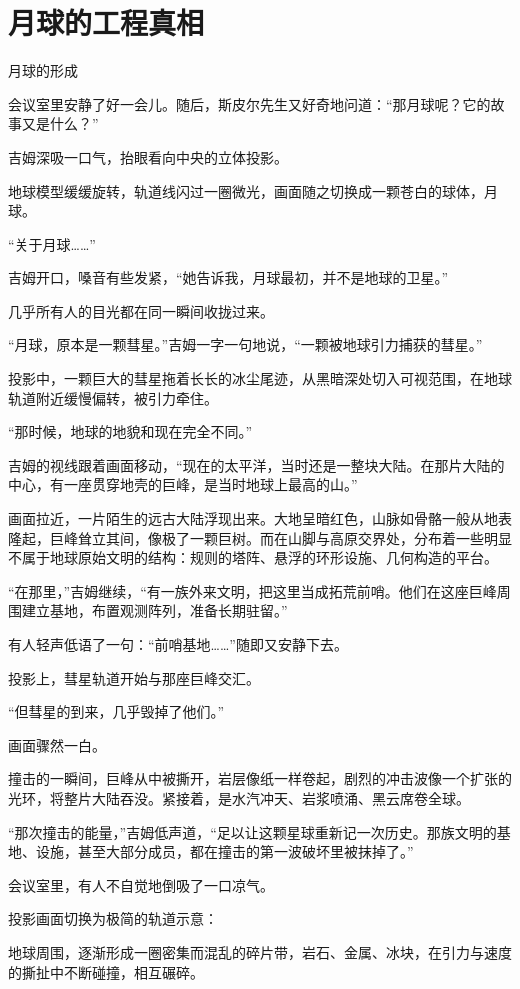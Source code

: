 \chapter{月球的工程真相}

月球的形成

会议室里安静了好一会儿。随后，斯皮尔先生又好奇地问道：“那月球呢？它的故事又是什么？”

吉姆深吸一口气，抬眼看向中央的立体投影。

地球模型缓缓旋转，轨道线闪过一圈微光，画面随之切换成一颗苍白的球体，月球。

“关于月球……”

吉姆开口，嗓音有些发紧，“她告诉我，月球最初，并不是地球的卫星。”

几乎所有人的目光都在同一瞬间收拢过来。

“月球，原本是一颗彗星。”吉姆一字一句地说，“一颗被地球引力捕获的彗星。”

投影中，一颗巨大的彗星拖着长长的冰尘尾迹，从黑暗深处切入可视范围，在地球轨道附近缓慢偏转，被引力牵住。

“那时候，地球的地貌和现在完全不同。”

吉姆的视线跟着画面移动，“现在的太平洋，当时还是一整块大陆。在那片大陆的中心，有一座贯穿地壳的巨峰，是当时地球上最高的山。”

画面拉近，一片陌生的远古大陆浮现出来。大地呈暗红色，山脉如骨骼一般从地表隆起，巨峰耸立其间，像极了一颗巨树。而在山脚与高原交界处，分布着一些明显不属于地球原始文明的结构：规则的塔阵、悬浮的环形设施、几何构造的平台。

“在那里，”吉姆继续，“有一族外来文明，把这里当成拓荒前哨。他们在这座巨峰周围建立基地，布置观测阵列，准备长期驻留。”

有人轻声低语了一句：“前哨基地……”随即又安静下去。

投影上，彗星轨道开始与那座巨峰交汇。

“但彗星的到来，几乎毁掉了他们。”

画面骤然一白。

撞击的一瞬间，巨峰从中被撕开，岩层像纸一样卷起，剧烈的冲击波像一个扩张的光环，将整片大陆吞没。紧接着，是水汽冲天、岩浆喷涌、黑云席卷全球。

“那次撞击的能量，”吉姆低声道，“足以让这颗星球重新记一次历史。那族文明的基地、设施，甚至大部分成员，都在撞击的第一波破坏里被抹掉了。”

会议室里，有人不自觉地倒吸了一口凉气。

投影画面切换为极简的轨道示意：

地球周围，逐渐形成一圈密集而混乱的碎片带，岩石、金属、冰块，在引力与速度的撕扯中不断碰撞，相互碾碎。

